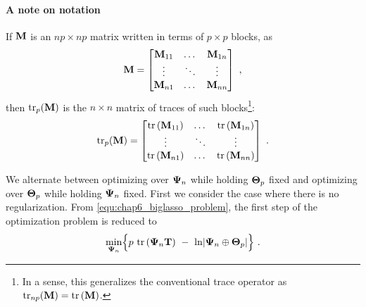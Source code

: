     \paragraph{A note on notation} If $\mathbf{M}$ is an $np \times np$ matrix written in terms of $p \times p$ blocks, as
    \[
      \mathbf{M} = \begin{bmatrix}  \mathbf{M}_{11} &\dots &\mathbf{M}_{1n} \\ \vdots &\ddots &\vdots \\ \mathbf{M}_{n1} &\dots &\mathbf{M}_{nn}  \end{bmatrix} ~,
    \]
    then $\textrm{tr}_p(\mathbf{M})$ is the $n \times n$ matrix of traces of such blocks\footnote{In a sense, this generalizes the conventional trace operator as $\textrm{tr}_{np}(\mathbf{M}) = \textrm{tr} \left( \mathbf{M} \right)$.}:
    \[
      \textrm{tr}_p(\mathbf{M}) = \begin{bmatrix}  \textrm{tr} \left( \mathbf{M}_{11} \right) &\dots &\textrm{tr} \left( \mathbf{M}_{1n} \right) \\ \vdots &\ddots &\vdots \\ \textrm{tr} \left( \mathbf{M}_{n1} \right) &\dots &\textrm{tr} \left( \mathbf{M}_{nn} \right)  \end{bmatrix} ~.
    \]
    
    We alternate between optimizing over $\mathbf{\Psi}_n$ while holding $\mathbf{\Theta}_p$ fixed and optimizing over $\mathbf{\Theta}_p$ while holding $\mathbf{\Psi}_n$ fixed.
    First we consider the case where there is no regularization. From \eqref{equ:chap6_biglasso_problem}, the first step of the optimization problem is reduced to
    \begin{equation} \label{equ:chap6_biglasso_minPsi}
      \underset{\mathbf{\Psi}_n}{\textrm{min}} \Big\{ p~\textrm{tr} \left( \mathbf{\Psi}_n \mathbf{T} \right) ~-~ \ln \lvert \mathbf{\Psi}_n \oplus \mathbf{\Theta}_p \rvert \Big\} ~.
    \end{equation}
    
